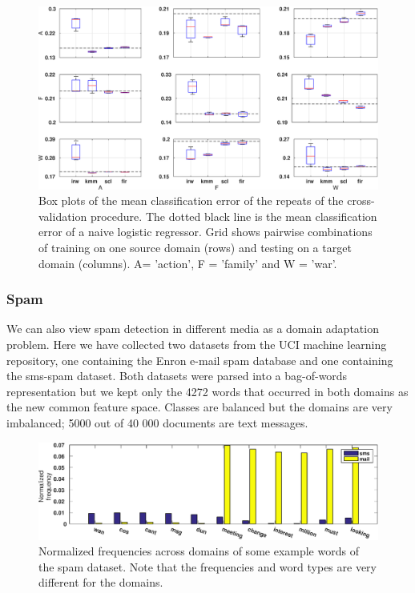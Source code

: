 \documentclass[twoside,11pt]{article}
\begin{document}
\begin{figure}[ht]
	\centering
	\includegraphics[width=.9\textwidth]{images/err_imdb_box.eps}
	\caption{Box plots of the mean classification error of the repeats of the cross-validation procedure. The dotted black line is the mean classification error of a naive logistic regressor. Grid shows pairwise combinations of training on one source domain (rows) and testing on a target domain (columns). A= 'action', F = 'family' and W = 'war'.}
	\label{err_imdb}
\end{figure}


\subsubsection{Spam}
We can also view spam detection in different media as a domain adaptation problem. Here we have collected two datasets from the UCI machine learning repository, one containing the Enron e-mail spam database and one containing the sms-spam dataset. Both datasets were parsed into a bag-of-words representation but we kept only the 4272 words that occurred in both domains as the new common feature space. Classes are balanced but the domains are very imbalanced; 5000 out of 40 000 documents are text messages.

\begin{figure}[ht]
	\centering
	\includegraphics[width=.9\textwidth]{images/eg_spam.eps}
	\caption{Normalized frequencies across domains of some example words of the spam dataset. Note that the frequencies and word types are very different for the domains.}
	\label{eg_spam}
\end{figure}
\end{document}
